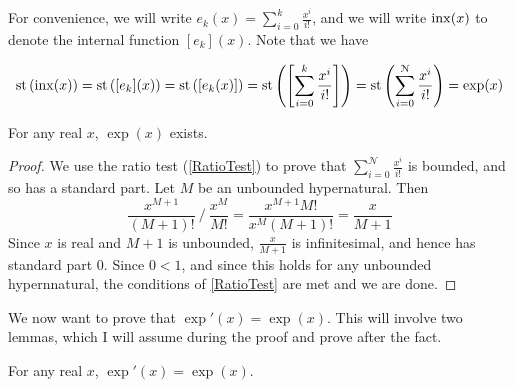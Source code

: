 For convenience, we will write $e_k(x) = \sum_{i=0}^k \frac{x^i}{i!}$, and we will write $\operatorname{inx}(x)$ to denote the internal function $[e_k](x)$. Note that we have

\[\operatorname{st}\left(\operatorname{inx}(x)\right) = \operatorname{st}\left([e_k](x)\right) = \operatorname{st}\left([e_k(x)]\right) = \operatorname{st}\left(\left[\sum_{i=0}^k\frac{x^i}{i!}\right]\right) = \operatorname{st}\left(\sum_{i=0}^\mathcal{N} \frac{x^i}{i!}\right) = \exp(x) \]

\begin{thm}
    For any real $x$, $\exp(x)$ exists.
\end{thm}

\begin{proof}
    We use the ratio test (\ref{RatioTest}) to prove that $\sum_{i=0}^\mathcal{N} \frac{x^i}{i!}$ is bounded, and so has a standard part. Let $M$ be an unbounded hypernatural. Then 
    \[
        \frac{x^{M+1}}{(M+1)!} \  / \  \frac{x^M}{M!} = \frac{x^{M+1}M!}{x^M (M+1)!} 
        = \frac{x}{M+1}
    \]
    Since $x$ is real and $M+1$ is unbounded, $\frac{x}{M+1}$ is infinitesimal, and hence has standard part $0$. Since $0 < 1$, and since this holds for any unbounded hypernnatural, the conditions of \ref{RatioTest} are met and we are done.
\end{proof}

We now want to prove that $\exp'(x) = \exp(x)$. This will involve two lemmas, which I will assume during the proof and prove after the fact.

\begin{thm}
    For any real $x$, $\exp'(x) = \exp(x)$.
\end{thm}

